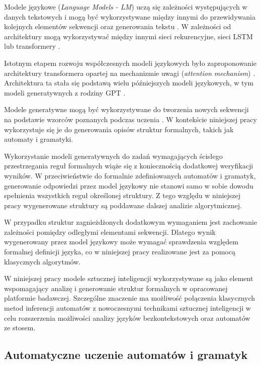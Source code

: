 \documentclass[12pt]{article}
\begin{document}
Modele językowe (\textit{Language Models - LM}) uczą się zależności występujących w danych tekstowych i mogą być wykorzystywane między innymi do przewidywania kolejnych elementów sekwencji oraz generowania tekstu \cite{brown2020,jurafsky2026}. W zależności od architektury mogą wykorzystywać między innymi sieci rekurencyjne, sieci LSTM lub transformery \cite{vaswani2017,jurafsky2026}.

Istotnym etapem rozwoju współczesnych modeli językowych było zaproponowanie architektury transformera opartej na mechanizmie uwagi (\textit{attention mechanism}) \cite{vaswani2017}. Architektura ta stała się podstawą wielu późniejszych modeli językowych, w tym modeli generatywnych z rodziny GPT \cite{brown2020}.

Modele generatywne mogą być wykorzystywane do tworzenia nowych sekwencji na podstawie wzorców poznanych podczas uczenia \cite{brown2020,zhao2023}. W kontekście niniejszej pracy wykorzystuje się je do generowania opisów struktur formalnych, takich jak automaty i gramatyki.

Wykorzystanie modeli generatywnych do zadań wymagających ścisłego przestrzegania reguł formalnych wiąże się z koniecznością dodatkowej weryfikacji wyników. W przeciwieństwie do formalnie zdefiniowanych automatów i gramatyk, generowanie odpowiedzi przez model językowy nie stanowi samo w sobie dowodu spełnienia wszystkich reguł określonej struktury. Z tego względu w niniejszej pracy wygenerowane struktury są poddawane dalszej analizie algorytmicznej.

W przypadku struktur zagnieżdżonych dodatkowym wymaganiem jest zachowanie zależności pomiędzy odległymi elementami sekwencji. Dlatego wynik wygenerowany przez model językowy może wymagać sprawdzenia względem formalnej definicji języka, co w niniejszej pracy realizowane jest za pomocą klasycznych algorytmów.

W niniejszej pracy modele sztucznej inteligencji wykorzystywane są jako element wspomagający analizę i generowanie struktur formalnych w opracowanej platformie badawczej. Szczególne znaczenie ma możliwość połączenia klasycznych metod inferencji automatów z nowoczesnymi technikami sztucznej inteligencji w celu rozszerzenia możliwości analizy języków bezkontekstowych oraz automatów ze stosem.

\subsection{Automatyczne uczenie automatów i gramatyk}
\end{document}
